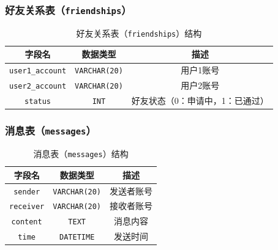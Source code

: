 \documentclass[UTF8]{ctexart}
\begin{document}
\subsubsection{好友关系表（\texttt{friendships}）}
\begin{table}[h]
	\centering
	\begin{tabular}{|c|c|c|}
		\hline
		字段名 & 数据类型 & 描述 \\
		\hline
		\texttt{user1\_account} & \texttt{VARCHAR(20)} & 用户1账号 \\
		\texttt{user2\_account} & \texttt{VARCHAR(20)} & 用户2账号 \\
		\texttt{status} & \texttt{INT} & 好友状态（0：申请中，1：已通过） \\
		\hline
	\end{tabular}
	\caption{好友关系表（\texttt{friendships}）结构}
	\label{tab:friendships}
\end{table}

\subsubsection{消息表（\texttt{messages}）}
\begin{table}[h]
	\centering
	\begin{tabular}{|c|c|c|}
		\hline
		字段名 & 数据类型 & 描述 \\
		\hline
		\texttt{sender} & \texttt{VARCHAR(20)} & 发送者账号 \\
		\texttt{receiver} & \texttt{VARCHAR(20)} & 接收者账号 \\
		\texttt{content} & \texttt{TEXT} & 消息内容 \\
		\texttt{time} & \texttt{DATETIME} & 发送时间 \\
		\hline
	\end{tabular}
	\caption{消息表（\texttt{messages}）结构}
	\label{tab:messages}
\end{table}
\end{document}
